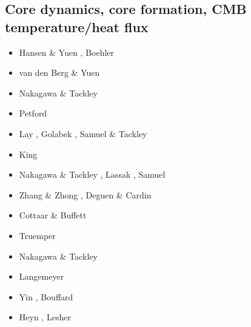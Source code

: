 \subsection{Core dynamics, core formation, CMB temperature/heat flux}

\begin{scriptsize}
\begin{itemize}
\item[\nineteenninetysix] Hansen \& Yuen \cite{hayu96}, Boehler \cite{boeh96}
\item[\nineteenninetyeight] van den Berg \& Yuen \cite{vayu98}
\item[\twothousandfour] Nakagawa \& Tackley \cite{nata04c}
\item[\twothousandseven] Petford \etal \cite{pery07}
\item[\twothousandeight] Lay \etal \cite{lahb08}, Golabek \etal \cite{gost08}, Samuel \& Tackley \cite{sata08}
\item[\twothousandnine] King \etal \cite{kisn09}\\
\item[\twothousandten] Nakagawa \& Tackley \cite{nata10}, Lassak \etal \cite{lamg10}, 
                       Samuel \etal \cite{sate10}
\item[\twothousandeleven] Zhang \& Zhong  \cite{zhzh11}, Deguen \& Cardin \cite{deca11}
\item[\twothousandtwelve] Cottaar \& Buffett  \cite{cobu12}
\item[\twothousandtwelve] Truemper \etal  \cite{trbh12}
\item[\twothousandthirteen] Nakagawa \& Tackley  \cite{nata13}
\item[\twothousandeighteen] Langemeyer \etal  \cite{lalt18}
\item[\twothousandnineteen] Yin \etal  \cite{yiym19}, Bouffard \etal \cite{bocl19}
\item[\twothousandtwenty] Heyn \etal \cite{hect20}, Lesher \etal \cite{ledb20}
\end{itemize}
\end{scriptsize}

